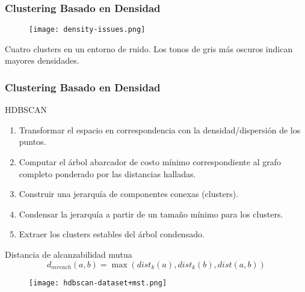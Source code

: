 \begin{frame}
    \frametitle{Clustering Basado en Densidad}

    \begin{figure}[!h]
        \centering
        \texttt{[image: density-issues.png]}
    \end{figure}

    {\footnotesize
    Cuatro clusters en un entorno de ruido.
    Los tonos de gris más oscuros indican mayores densidades.
    }

\end{frame}

\begin{frame}
    \frametitle{Clustering Basado en Densidad}

    \begin{block}{HDBSCAN}
        \begin{enumerate}
            \item<2-> Transformar el espacio en correspondencia con la densidad/dispersión de los puntos.
            \item<3-> Computar el árbol abarcador de costo mínimo correspondiente al grafo completo ponderado por las distancias halladas.
            \item<4-> Construir una jerarquía de componentes conexas (clusters).
            \item<5-> Condensar la jerarquía a partir de un tamaño mínimo para los clusters.
            \item<6-> Extraer los clusters estables del árbol condensado.
        \end{enumerate}
    \end{block}

\end{frame}

\begin{frame}

    \begin{block}{Distancia de alcanzabilidad mutua}
        \begin{equation*}
            d_{mreach}(a,b)=\max(dist_k(a), dist_k(b), dist(a,b))
        \end{equation*}
    \end{block}

    \begin{figure}[!h]
        \centering
        \texttt{[image: hdbscan-dataset+mst.png]}
    \end{figure}

\end{frame}

